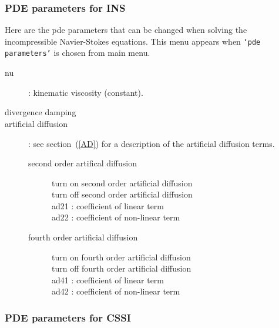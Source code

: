 \subsubsection{PDE parameters for INS}\label{sec:pdeParams}
 

 Here are the pde parameters that can be changed when solving the incompressible Navier-Stokes equations.
 This menu appears when {\tt `pde parameters'} is chosen from main menu.
\begin{description}
  \item[nu] : kinematic viscosity (constant).
  \item[divergence damping]
  \item[artificial diffusion] : see section~(\ref{AD}) for a description of the artificial diffusion terms.
    \begin{description}
      \item[second order artifical diffusion]
        \begin{description}
          \item[turn on second order artificial diffusion]
          \item[turn off second order artificial diffusion]
          \item[ad21 : coefficient of linear term]
          \item[ad22 : coefficient of non-linear term]
        \end{description}
      \item[fourth order artificial diffusion]
        \begin{description}
          \item[turn on fourth order artificial diffusion]
          \item[turn off fourth order artificial diffusion]
          \item[ad41 : coefficient of linear term]
          \item[ad42 : coefficient of non-linear term]
        \end{description}
    \end{description}
  \end{description}

\subsubsection{PDE parameters for CSSI}\label{sec:cssiPdeParams}
 

